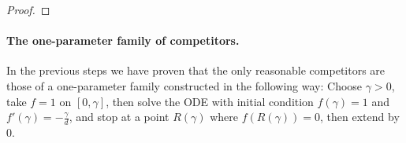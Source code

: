 \documentclass[11pt,a4paper]{article}
\numberwithin{equation}{section}
\theoremstyle{plain}
\theoremstyle{remark}
\begin{document}
\begin{proof}
\end{proof}



\paragraph{The one-parameter family of competitors.}

In the previous steps we have proven that the only reasonable competitors are those of a one-parameter family constructed in the following way: Choose $\gamma>0$, take $f=1$ on $[0,\gamma]$, then solve the ODE with initial condition $f(\gamma)=1$ and $f'(\gamma)=-\frac\gamma d$, and stop at a point $R(\gamma)$ where $f(R(\gamma))=0$, then extend by $0$.
 
\end{document}
